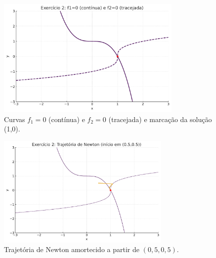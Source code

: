 \documentclass[12pt,a4paper]{article}
\begin{document}
\begin{figure}[H]
  \centering
  \includegraphics[width=0.8\textwidth]{figures/ex2_contours.pdf}
  \caption{Curvas $f_1=0$ (contínua) e $f_2=0$ (tracejada) e marcação da solução (1,0).}
  \label{fig:ex2_contours}
\end{figure}

\begin{figure}[H]
  \centering
  \includegraphics[width=0.75\textwidth]{figures/ex2_newton_trajectory.pdf}
  \caption{Trajetória de Newton amortecido a partir de $(0{,}5,0{,}5)$.}
  \label{fig:ex2_traj}
\end{figure}
\end{document}

